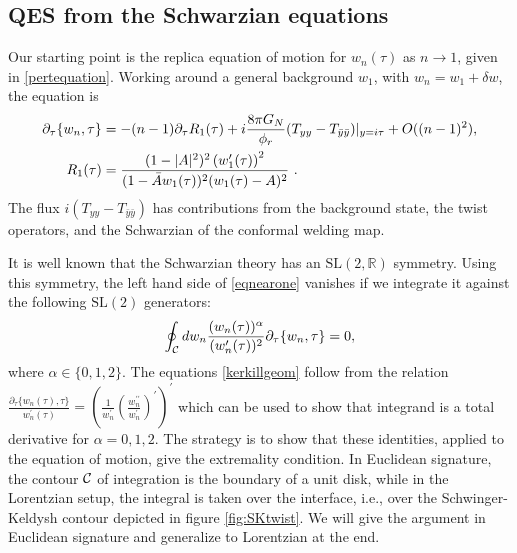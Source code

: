 \documentclass[11pt,oneside,letterpaper]{article}
\newcommand{\p}{\partial}
\newcommand{\f}{\frac}
\let\l=\lambda \let\m=\mu \let\n=\nu \let\x=\xi \let\p=\phi \let\r=v
\let\f=\frac
\let\pa=\partial
\def\ba{\begin{eqnarray}}
\def\ea{\end{eqnarray}}
\renewcommand{\p}{\partial}
\numberwithin{equation}{section}
\def\m{{\mu}}
\def\n{{\nu}}
\def\p{{\phi}}
\def\ba{\begin{eqnarray}}
\def\ea{\end{eqnarray}}
\def\r{\rightarrow}
\def\f {\frac}
\def\l{\left}
\def\r{\right}
\def \bA {\bar{A}}
\def\x{\bar{x}}
\renewcommand{\p}{\partial}
\newcommand{\by}{\bar{y}}
\begin{document}
\begin{spacing}{1.1}
\subsection{QES from the Schwarzian equations} \label{sec:QESSch}
Our starting point is the replica equation of motion for $w_n(\tau)$ as $n \to 1$, given in \eqref{pertequation}. Working around a general background $w_1$, with $w_n = w_1 + \delta w$, the equation is 
\begin{align}\label{eqnearone}
 \p_\tau \{w_n, \tau \} & = - (n-1) \p_\tau R_1(\tau) +i  \f{8\pi G_N}{\phi_r}  (  T_{yy} -  T_{\by \by} ) |_{y = i \tau}  + O((n-1)^2),\\
R_1 (\tau) &=\frac{(1-|A|^2)^2 \l(w_1'(\tau)\r)^2}{(1- \bA w_1(\tau))^2(w_1(\tau)-A)^2} \ . \notag
\end{align}
The flux $i (  T_{yy} -  T_{\by \by} )$ has contributions from the background state, the twist operators, and the Schwarzian of the conformal welding map.


 
 It is well known that the Schwarzian theory has an $\text{SL}(2, \mathbb{R})$ symmetry. Using this symmetry, the left hand side of \eqref{eqnearone} vanishes if we integrate it against the following $\text{SL}(2)$ generators:
\ba\label{kerkillgeom}
\oint_{\cal C} dw_n \frac{(w_n(\tau))^\alpha}{(w_n'(\tau))^2} \pa_{\tau}\{ w_n ,\tau \}=0,
\ea 
where $\alpha \in \{0,1,2\}$. The equations \eqref{kerkillgeom} follow from the relation $ \f{ \pa_\tau\{ w_n(\tau), \tau \}}{w_n^\prime (\tau)}= \l( \f{1}{w_n^\prime} \l( \f{w_n^{\prime \prime}}{w_n^\prime} \r)^\prime \r)^\prime$ which can be used to show that integrand is a total derivative for $\alpha = 0,1,2$.
The strategy is to show that these identities, applied to the equation of motion, give the extremality condition. In Euclidean signature, the contour ${\cal C}$ of integration is the boundary of a unit disk, while in the Lorentzian setup, the integral is taken over the interface, i.e., over the Schwinger-Keldysh contour depicted in figure \ref{fig:SKtwist}. We will give the argument in Euclidean signature and generalize to Lorentzian at the end. 


\end{spacing}
\end{document}
